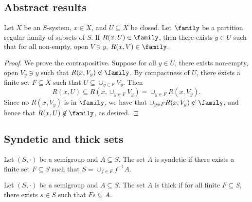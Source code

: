 \subsection{Abstract results}

\begin{lemma}
\label{lemma_pr_family_concentration}
\leanok{}
    Let $X$ be an $S$-system, $x \in X$, and $U \subseteq X$ be closed.  Let $\family$ be a partition regular family of subsets of $S$. If $R(x,U) \in \family$, then there exists $y \in U$ such that for all non-empty, open $V \ni y$, $R(x,V) \in \family$.
\end{lemma}

\begin{proof}
    We prove the contrapositive.  Suppose for all $y \in U$, there exists non-empty, open $V_y \ni y$ such that $R(x,V_y) \not\in \family$.  By compactness of $U$, there exists a finite set $F \subseteq X$ such that $U \subseteq \cup_{y \in F} V_y$. Then
    \[R(x,U) \subseteq R(x,\cup_{y \in F} V_y) = \cup_{y \in F} R(x,V_y).\]
    Since no $R(x,V_y)$ is in $\family$, we have that $\cup_{y \in F} R(x,V_y) \not\in \family$, and hence that $R(x,U) \not\in \family$, as desired.
\end{proof}



\subsection{Syndetic and thick sets}

\begin{definition}
\label{def_syndetic}
\leanok{}
Let $(S,\cdot)$ be a semigroup and $A \subseteq S$.  The set $A$ is syndetic if there exists a finite set $F \subseteq S$ such that $S = \cup_{f \in F} f^{-1} A$.
\end{definition}

\begin{definition}
\label{def_thick}
\leanok{}
Let $(S,\cdot)$ be a semigroup and $A \subseteq S$. The set $A$ is thick if for all finite $F \subseteq S$, there exists $s \in S$ such that $Fs \subseteq A$.
\end{definition}

